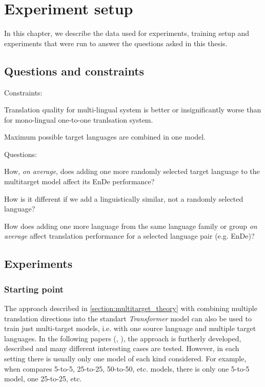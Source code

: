 \chapter{Experiment setup}
\label{chapter:experiment_setup}

In this chapter, we describe the data used for experiments, training setup
and experiments that were run to answer the questions asked in this thesis.

\section{{Questions and constraints}}
\label{section:questions_and_constraints}

Constraints:
\begin{displayquote}
	Translation quality for multi-lingual system is better or insignificantly
	worse than for mono-lingual one-to-one tranlsation system.

	Maximum possible target languages are combined in one model.
\end{displayquote}

Questions:
\begin{displayquote}
	How, \emph{on average}, does adding one more randomly selected target language
	to the multitarget model affect its En\to{}De performance?

	How is it different if we add a linguistically similar,
	not a randomly selected language?

	How does adding one more language from the same language family or group 
	\emph{on average} affect translation performance for a selected language
	pair (e.g. En\to{}De)?
\end{displayquote}



\section{Experiments}
\label{section:experiments}
\subsection{Starting point}
\label{subsection:starting_point}

The approach described in \cref{section:multitarget_theory} with combining multiple
translation directions into the standart \emph{Transformer} model can also be used to
train just multi-target models, i.e. with one source language and multiple target languages.
In the following papers
(, ),
  the approach is furtherly developed, described and many different interesting cases are tested.
However, in each setting there is usually only one model of each kind considered.
For example, when \citet{aharoni-etal-2019-massively} compares 5-to-5,
25-to-25, 50-to-50, etc. models, there is only one 5-to-5 model, one 25-to-25, etc.

